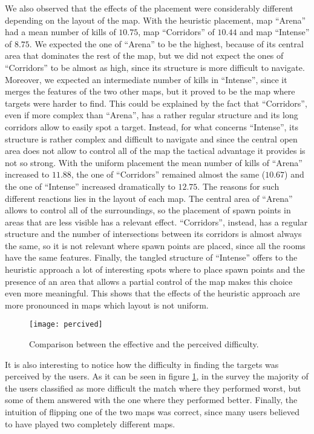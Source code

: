 \par

We also observed that the effects of the placement were considerably different depending on the layout of the map. With the heuristic placement, map ``Arena'' had a mean number of kills of $10.75$, map ``Corridors'' of $10.44$ and map ``Intense'' of $8.75$. We expected the one of ``Arena'' to be the highest, because of its central area that dominates the rest of the map, but we did not expect the ones of ``Corridors'' to be almost as high, since its structure is more difficult to navigate. Moreover, we expected an intermediate number of kills in ``Intense'', since it merges the features of the two other maps, but it proved to be the map where targets were harder to find. This could be explained by the fact that ``Corridors'', even if more complex than ``Arena'', has a rather regular structure and its long corridors allow to easily spot a target. Instead, for what concerns ``Intense'', its structure is rather complex and difficult to navigate and since the central open area does not allow to control all of the map the tactical advantage it provides is not so strong. With the uniform placement the mean number of kills of ``Arena'' increased to $11.88$, the one of ``Corridors'' remained almost the same ($10.67$) and the one of ``Intense'' increased dramatically to $12.75$. The reasons for such different reactions lies in the layout of each map. The central area of ``Arena'' allows to control all of the surroundings, so the placement of spawn points in areas that are less visible has a relevant effect. ``Corridors'', instead, has a regular structure and the number of intersections between its corridors is almost always the same, so it is not relevant where spawn points are placed, since all the rooms have the same features. Finally, the tangled structure of ``Intense'' offers to the heuristic approach a lot of interesting spots where to place spawn points and the presence of an area that allows a partial control of the map makes this choice even more meaningful. This shows that the effects of the heuristic approach are more pronounced in maps which layout is not uniform.

\begin{figure}
\centering
\texttt{[image: percived]}
\caption{Comparison between the effective and the perceived difficulty.}
\label{img:percived} 
\end{figure}

It is also interesting to notice how the difficulty in finding the targets was perceived by the users. As it can be seen in figure \ref{img:percived}, in the survey the majority of the users classified as more difficult the match where they performed worst, but some of them answered with the one where they performed better. Finally, the intuition of flipping one of the two maps was correct, since many users believed to have played two completely different maps. 

